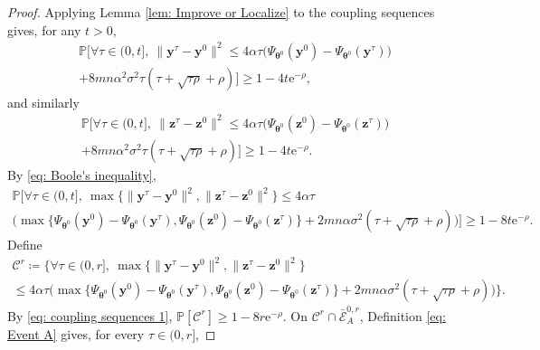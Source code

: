 \documentclass{siamart251216}
\begin{document}
\begin{proof}
Applying Lemma \ref{lem: Improve or Localize} to the coupling sequences gives, for any $t>0$,
    \begin{multline}
        \label{eq: Localize y}
        \mathbb{P}\Big[\forall\tau\in(0,t],~\|\mathbf{y}^{\tau}-\mathbf{y}^{0}\|^{2}
        \leq4\alpha\tau\big(\Psi_{\boldsymbol{\theta}^{0}}(\mathbf{y}^{0})-\Psi_{\boldsymbol{\theta}^{0}}(\mathbf{y}^{\tau})\big)\\
        +8mn\alpha^{2}\sigma^{2}\tau(\tau+\sqrt{\tau\rho}+\rho)\Big]\geq1-4t\mathrm{e}^{-\rho},
    \end{multline}
    and similarly
    \begin{multline}
        \label{eq: Localize z}
        \mathbb{P}\Big[\forall\tau\in(0,t],~\|\mathbf{z}^{\tau}-\mathbf{z}^{0}\|^{2}
        \leq4\alpha\tau\big(\Psi_{\boldsymbol{\theta}^{0}}(\mathbf{z}^{0})-\Psi_{\boldsymbol{\theta}^{0}}(\mathbf{z}^{\tau})\big)\\
        +8mn\alpha^{2}\sigma^{2}\tau(\tau+\sqrt{\tau\rho}+\rho)\Big]\geq1-4t\mathrm{e}^{-\rho}.
    \end{multline}
    By \eqref{eq: Boole's inequality},
    \begin{multline}
        \label{eq: coupling sequences 1}
        \mathbb{P}\Big[\forall\tau\in(0,t],~
        \max\{\|\mathbf{y}^{\tau}-\mathbf{y}^{0}\|^{2},\|\mathbf{z}^{\tau}-\mathbf{z}^{0}\|^{2}\}\leq4\alpha\tau\\
        \Big(\max\{\Psi_{\boldsymbol{\theta}^{0}}(\mathbf{y}^{0})-\Psi_{\boldsymbol{\theta}^{0}}(\mathbf{y}^{\tau}),
        \Psi_{\boldsymbol{\theta}^{0}}(\mathbf{z}^{0})-\Psi_{\boldsymbol{\theta}^{0}}(\mathbf{z}^{\tau})\}
        +2mn\alpha\sigma^{2}(\tau+\sqrt{\tau\rho}+\rho)\Big)\Big]\geq1-8t\mathrm{e}^{-\rho}.
    \end{multline}
    Define
    \begin{multline}
        \label{eq: D1}
        \mathcal{C}^{r}\coloneqq\Big\{\forall\tau\in(0,r],~
        \max\{\|\mathbf{y}^{\tau}-\mathbf{y}^{0}\|^{2},\|\mathbf{z}^{\tau}-\mathbf{z}^{0}\|^{2}\}\\
        \leq4\alpha\tau\Big(\max\{\Psi_{\boldsymbol{\theta}^{0}}(\mathbf{y}^{0})-\Psi_{\boldsymbol{\theta}^{0}}(\mathbf{y}^{\tau}),
        \Psi_{\boldsymbol{\theta}^{0}}(\mathbf{z}^{0})-\Psi_{\boldsymbol{\theta}^{0}}(\mathbf{z}^{\tau})\}
        +2mn\alpha\sigma^{2}(\tau+\sqrt{\tau\rho}+\rho)\Big)\Big\}.
    \end{multline}
    By \eqref{eq: coupling sequences 1}, $\mathbb{P}[\mathcal{C}^{r}]\geq1-8r\mathrm{e}^{-\rho}$. On $\mathcal{C}^{r}\cap\bar{\mathcal{E}}_{A}^{0,r}$, Definition \eqref{eq: Event A} gives, for every $\tau\in(0,r]$,

\end{proof}
\end{document}
